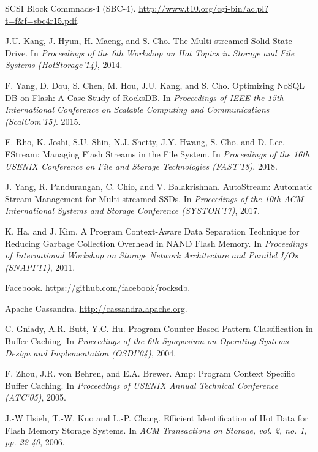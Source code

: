 \newpage


\begin{thebibliography}{00}

SCSI Block Commnads-4 (SBC-4).
\url{http://www.t10.org/cgi-bin/ac.pl?t=f&f=sbc4r15.pdf}.

J.U. Kang, J. Hyun, H. Maeng, and S. Cho. 
The Multi-streamed Solid-State Drive.
In \textit{Proceedings of the 6th Workshop on Hot Topics in Storage and File Systems (HotStorage'14)}, 2014.

F. Yang, D. Dou, S. Chen, M. Hou, J.U. Kang, and S. Cho.
Optimizing NoSQL DB on Flash: A Case Study of RocksDB.
In \textit{Proceedings of IEEE the 15th International Conference on Scalable Computing
and Communications (ScalCom'15)}. 2015.

E. Rho, K. Joshi, S.U. Shin, N.J. Shetty, J.Y. Hwang, S. Cho. and D. Lee. 
FStream: Managing Flash Streams in the File System.
In \textit{Proceedings of the 16th USENIX Conference on File and Storage Technologies (FAST'18)}, 2018.

J. Yang, R. Pandurangan, C. Chio, and V. Balakrishnan.
AutoStream: Automatic Stream Management for Multi-streamed SSDs.
In \textit{Proceedings of the 10th ACM International Systems and Storage Conference (SYSTOR'17)}, 2017.

K. Ha, and J. Kim.
A Program Context-Aware Data Separation Technique for Reducing Garbage Collection Overhead in NAND Flash Memory.
In \textit{Proceedings of International Workshop on Storage Network Architecture 
and Parallel I/Os (SNAPI'11)}, 2011.

Facebook. 
\url{https://github.com/facebook/rocksdb}.

Apache Cassandra. 
\url{http://cassandra.apache.org}.

C. Gniady, A.R. Butt, Y.C. Hu.
Program-Counter-Based Pattern Classification in Buffer Caching.
In \textit{Proceedings of the 6th Symposium on Operating Systems Design and Implementation (OSDI'04)}, 2004.

F. Zhou, J.R. von Behren, and E.A. Brewer.
Amp: Program Context Specific Buffer Caching.
In \textit{Proceedings of USENIX Annual Technical Conference (ATC'05)}, 2005.

J.-W Hsieh, T.-W. Kuo and L.-P. Chang.
Efficient Identification of Hot Data for Flash Memory Storage Systems.
In \textit{ACM Transactions on Storage, vol. 2, no. 1, pp. 22-40}, 2006.


\end{thebibliography}
